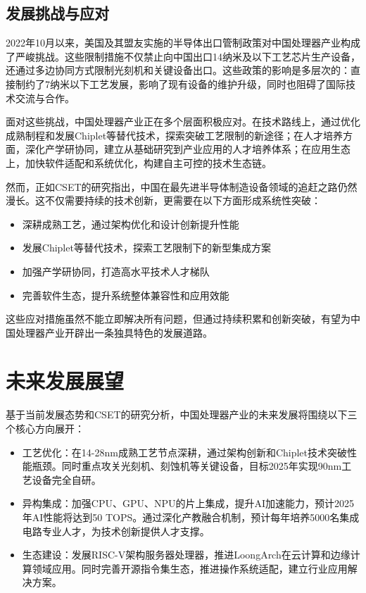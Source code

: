 \documentclass[a4paper,colorlinks=true,linkcolor=blue,urlcolor=blue,citecolor=green,bookmarks=true]{article}
\begin{document}
\subsection{发展挑战与应对}

2022年10月以来，美国及其盟友实施的半导体出口管制政策对中国处理器产业构成了严峻挑战。这些限制措施不仅禁止向中国出口14纳米及以下工艺芯片生产设备，还通过多边协同方式限制光刻机和关键设备出口。这些政策的影响是多层次的：直接制约了7纳米以下工艺发展，影响了现有设备的维护升级，同时也阻碍了国际技术交流与合作\cite{4}。

面对这些挑战，中国处理器产业正在多个层面积极应对。在技术路线上，通过优化成熟制程和发展Chiplet等替代技术，探索突破工艺限制的新途径；在人才培养方面，深化产学研协同，建立从基础研究到产业应用的人才培养体系；在应用生态上，加快软件适配和系统优化，构建自主可控的技术生态链。

然而，正如CSET的研究指出，中国在最先进半导体制造设备领域的追赶之路仍然漫长。这不仅需要持续的技术创新，更需要在以下方面形成系统性突破：

\begin{itemize}
\item 深耕成熟工艺，通过架构优化和设计创新提升性能
\item 发展Chiplet等替代技术，探索工艺限制下的新型集成方案
\item 加强产学研协同，打造高水平技术人才梯队
\item 完善软件生态，提升系统整体兼容性和应用效能
\end{itemize}

这些应对措施虽然不能立即解决所有问题，但通过持续积累和创新突破，有望为中国处理器产业开辟出一条独具特色的发展道路。

\section{未来发展展望}

基于当前发展态势和CSET的研究分析\cite{4}，中国处理器产业的未来发展将围绕以下三个核心方向展开：

\begin{itemize}
\item 工艺优化：在14-28nm成熟工艺节点深耕，通过架构创新和Chiplet技术突破性能瓶颈\cite{4}\cite{17}。同时重点攻关光刻机、刻蚀机等关键设备，目标2025年实现90nm工艺设备完全自研。

\item 异构集成：加强CPU、GPU、NPU的片上集成，提升AI加速能力，预计2025年AI性能将达到50 TOPS\cite{14}\cite{15}。通过深化产教融合机制，预计每年培养5000名集成电路专业人才\cite{3}\cite{17}，为技术创新提供人才支撑。

\item 生态建设：发展RISC-V架构服务器处理器，推进LoongArch在云计算和边缘计算领域应用\cite{6}\cite{19}。同时完善开源指令集生态，推进操作系统适配，建立行业应用解决方案\cite{6}\cite{9}\cite{19}。
\end{itemize}
\end{document}
